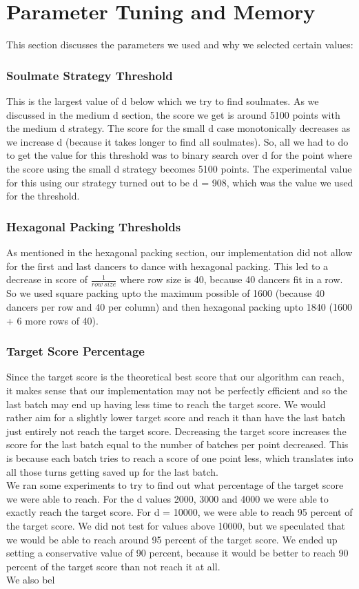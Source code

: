 \section{Parameter Tuning and Memory}
This section discusses the parameters we used and why we selected certain values:\\
\subsubsection{Soulmate Strategy Threshold}
This is the largest value of d below which we try to find soulmates. As we discussed in the medium d section, the score we get is around 5100 points with the medium d strategy. The score for the small d case monotonically decreases as we increase d (because it takes longer to find all soulmates). So, all we had to do to get the value for this threshold was to binary search over d for the point where the score using the small d strategy becomes 5100 points. The experimental value for this using our strategy turned out to be d = 908, which was the value we used for the threshold.\\
\subsubsection{Hexagonal Packing Thresholds}
As mentioned in the hexagonal packing section, our implementation did not allow for the first and last dancers to dance with hexagonal packing. This led to a decrease in score of $\frac{1}{row\ size}$ where row size is 40, because 40 dancers fit in a row. So we used square packing upto the maximum possible of 1600 (because 40 dancers per row and 40 per column) and then hexagonal packing upto 1840 (1600 + 6 more rows of 40).\\
\subsubsection{Target Score Percentage}
Since the target score is the theoretical best score that our algorithm can reach, it makes sense that our implementation may not be perfectly efficient and so the last batch may end up having less time to reach the target score.
We would rather aim for a slightly lower target score and reach it than have the last batch just entirely not reach the target score.  Decreasing the target score increases the score for the last batch equal to the number of batches per point decreased. This is because each batch tries to reach a score of one point less, which translates into all those turns getting saved up for the last batch.\\
We ran some experiments to try to find out what percentage of the target score we were able to reach. For the d values 2000, 3000 and 4000 we were able to exactly reach the target score. For d = 10000, we were able to reach 95 percent of the target score. We did not test for values above 10000, but we speculated that we would be able to reach around 95 percent of the target score. We ended up setting a conservative value of 90 percent, because it would be better to reach 90 percent of the target score than not reach it at all.\\
We also bel